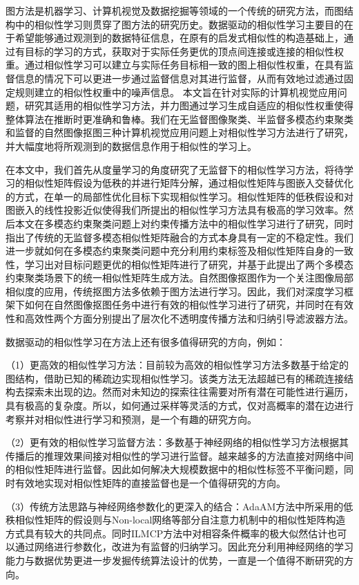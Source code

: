 
\begin{summary}
图方法是机器学习、计算机视觉及数据挖掘等领域的一个传统的研究方法，而图结构中的相似性学习则贯穿了图方法的研究历史。数据驱动的相似性学习主要目的在于希望能够通过观测到的数据特征信息，在原有的启发式相似性的构造基础上，通过有目标的学习的方式，获取对于实际任务更优的顶点间连接或连接的相似性权重。通过相似性学习可以建立与实际任务目标相一致的图上相似性权重，在具有监督信息的情况下可以更进一步通过监督信息对其进行监督，从而有效地过滤通过固定规则建立的相似性权重中的噪声信息。
本文旨在针对实际的计算机视觉应用问题，研究其适用的相似性学习方法，并力图通过学习生成自适应的相似性权重使得整体算法在推断时更准确和鲁棒。我们在无监督图像聚类、半监督多模态约束聚类和监督的自然图像抠图三种计算机视觉应用问题上对相似性学习方法进行了研究，并大幅度地将所观测到的数据信息作用于相似性的学习上。

在本文中，我们首先从度量学习的角度研究了无监督下的相似性学习方法，将待学习的相似性矩阵假设为低秩的并进行矩阵分解，通过相似性矩阵与图嵌入交替优化的方式，在单一的局部性优化目标下实现相似性学习。相似性矩阵的低秩假设和对图嵌入的线性投影近似使得我们所提出的相似性学习方法具有极高的学习效率。然后本文在多模态约束聚类问题上对约束传播方法中的相似性学习进行了研究，同时指出了传统的无监督多模态相似性矩阵融合的方式本身具有一定的不稳定性。我们进一步就如何在多模态约束聚类问题中充分利用约束标签及相似性矩阵自身的一致性，学习出对目标问题更优的相似性矩阵进行了研究，并基于此提出了两个多模态约束聚类场景下的统一相似性矩阵生成方法。自然图像抠图作为一个关注图像局部相似度的应用，传统抠图方法多依赖于图方法进行学习。因此，我们对深度学习框架下如何在自然图像抠图任务中进行有效的相似性学习进行了研究，并同时在有效性和高效性两个方面分别提出了层次化不透明度传播方法和归纳引导滤波器方法。

数据驱动的相似性学习在方法上还有很多值得研究的方向，例如：

（1）更高效的相似性学习方法：目前较为高效的相似性学习方法多数基于给定的图结构，借助已知的稀疏边实现相似性学习。该类方法无法超越已有的稀疏连接结构去探索未出现的边。然而对未知边的探索往往需要对所有潜在可能性进行遍历，具有极高的复杂度。所以，如何通过采样等灵活的方式，仅对高概率的潜在边进行考察并对相似性进行学习和预测，是一个有趣的研究方向。

（2）更有效的相似性学习监督方法：多数基于神经网络的相似性学习方法根据其传播后的推理效果间接对相似性的学习进行监督。越来越多的方法直接对网络中间的相似性矩阵进行监督\cite{yu2020context,wang2020affinity}。因此如何解决大规模数据中的相似性标签不平衡问题，同时有效地实现对相似性矩阵的直接监督也是一个值得研究的方向。

（3）传统方法思路与神经网络参数化的更深入的结合：AdaAM方法中所采用的低秩相似性矩阵的假设则与Non-local网络\cite{wang2018non}等部分自注意力机制中的相似性矩阵构造方式具有较大的共同点。同时ILMCP方法中对相容条件概率的极大似然估计也可以通过网络进行参数化，改进为有监督的归纳学习。因此充分利用神经网络的学习能力与数据优势更进一步发掘传统算法设计的优势，一直是一个值得不断研究的方向。
\end{summary}
